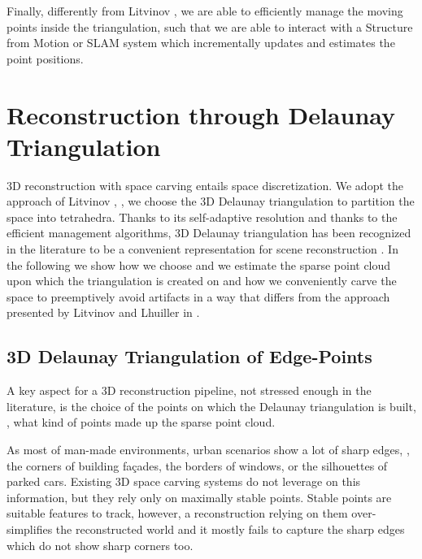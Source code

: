 Finally, differently from Litvinov \etal \cite{litvinov_lhuillier_13}, we are able to efficiently manage the moving points inside the triangulation, such that we are able to interact with a Structure from Motion or SLAM system which incrementally updates and estimates the point positions.



\section{Reconstruction through Delaunay Triangulation}
\label{sec:3D-Reconstruction}
3D reconstruction with space carving entails space discretization.
We adopt the approach of Litvinov \etal \cite{litvinov_lhuillier_13}, \ie, we choose the 3D Delaunay triangulation to partition the space into tetrahedra. 
Thanks to its self-adaptive resolution and thanks to the efficient management algorithms, 3D Delaunay triangulation has been recognized in the literature to be a convenient representation for scene reconstruction  \cite{litvinov_lhuillier_13, Pan_et_al09, labatut2007efficient, lovi_et_al_11}. 
In the following we show how we choose and we estimate the sparse point cloud upon which the triangulation is created on and how we conveniently carve the space to preemptively avoid artifacts in a  way that differs from the approach presented by Litvinov and Lhuiller in \cite{litvinov_Lhiuller14}.


\subsection{3D Delaunay Triangulation of Edge-Points}
\label{subsec:pcl_estimation}
A key aspect for a 3D reconstruction pipeline, not stressed enough in the literature, is the choice of the points on which the Delaunay triangulation is built, \ie, what kind of points made up the sparse point cloud.

As most of man-made environments, urban scenarios show a lot of sharp edges, \eg, the corners of building fa\c{c}ades, the borders of windows, or the silhouettes of parked cars. Existing 3D space carving systems do not leverage on this information, but they rely only on maximally stable points.
Stable points are suitable features to track, however, a reconstruction relying on them over-simplifies the reconstructed world and it mostly fails to capture the sharp edges which do not show sharp corners too.

